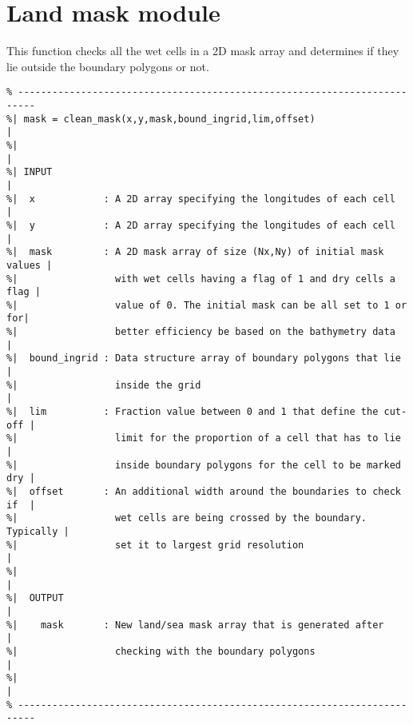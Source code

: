 \documentclass[12pt]{article}
\begin{document}
\section{Land mask module}
This function checks all the wet cells in a 2D mask array and determines if they lie outside the boundary polygons or not. 
\begin{verbatim}
% -------------------------------------------------------------------------
%| mask = clean_mask(x,y,mask,bound_ingrid,lim,offset)                    |
%|                                                                        |
%| INPUT                                                                  |
%|  x            : A 2D array specifying the longitudes of each cell      |
%|  y            : A 2D array specifying the longitudes of each cell      |
%|  mask         : A 2D mask array of size (Nx,Ny) of initial mask values |
%|                 with wet cells having a flag of 1 and dry cells a flag |
%|                 value of 0. The initial mask can be all set to 1 or for|
%|                 better efficiency be based on the bathymetry data      |
%|  bound_ingrid : Data structure array of boundary polygons that lie     |
%|                 inside the grid                                        |
%|  lim          : Fraction value between 0 and 1 that define the cut-off |
%|                 limit for the proportion of a cell that has to lie     | 
%|                 inside boundary polygons for the cell to be marked dry |
%|  offset       : An additional width around the boundaries to check if  |
%|                 wet cells are being crossed by the boundary. Typically |
%|                 set it to largest grid resolution                      |
%|                                                                        |
%|  OUTPUT                                                                |
%|    mask       : New land/sea mask array that is generated after        |
%|                 checking with the boundary polygons                    |
%|                                                                        |
% -------------------------------------------------------------------------
\end{verbatim}
\end{document}
